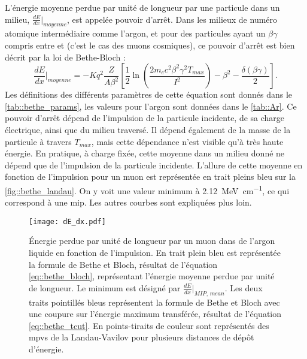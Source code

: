        L'énergie moyenne perdue par unité de longueur par une particule dans un milieu, $\frac{dE}{dx}\rvert_{moyenne}$, est appelée pouvoir d'arrêt. Dans les milieux de numéro atomique intermédiaire comme l'argon, et pour des particules ayant un $\beta\gamma$ compris entre  et  (c'est le cas des muons cosmiques), ce pouvoir d'arrêt est bien décrit par la loi de Bethe-Bloch\cite{pdg2018} :
        \begin{equation}\label{eq::bethe_bloch}
          \frac{dE}{dx}\biggr\rvert_{moyenne} = -Kq^2 \frac{Z}{A\beta^2}\left[\frac{1}{2}\ln\left(\frac{2m_ec^2\beta^2\gamma^2T_{max}}{I^2}\right)-\beta^2-\frac{\delta(\beta\gamma)}{2} \right].
        \end{equation}
        Les définitions des différents paramètres de cette équation sont donnés dans le \autoref{tab::bethe_params}, les valeurs pour l'argon sont données dans le \autoref{tab::Ar}. Ce pouvoir d'arrêt dépend de l'impulsion de la particule incidente, de sa charge électrique, ainsi que du milieu traversé. Il dépend également de la masse de la particule à travers $T_{max}$, mais cette dépendance n'est visible qu'à très haute énergie\cite{pdg2018}. En pratique, à charge fixée, cette moyenne dans un milieu donné ne dépend que de l'impulsion de la particule incidente. L'allure de cette moyenne en fonction de l'impulsion pour un muon est représentée en trait pleins bleu sur la \autoref{fig::bethe_landau}. On y voit une valeur minimum à \SI{2.12}{\mega\electronvolt\per\centi\meter}, ce qui correspond à une \gls{mip}. Les autres courbes sont expliquées plus loin.

        \begin{figure}[htbp]
          \centering
          \texttt{[image: dE\_dx.pdf]}
          \caption[Énergie perdue par unité de longueur d'une MIP en fonction de l'impulsion]{\label{fig::bethe_landau}Énergie perdue par unité de longueur par un muon dans de l'argon liquide en fonction de l'impulsion. En trait plein bleu est représentée la formule de Bethe et Bloch, résultat de l'équation \eqref{eq::bethe_bloch}, représentant l'énergie moyenne perdue par unité de longueur. Le minimum est désigné par $\frac{dE}{dx}\rvert_{MIP,\,mean}$. Les deux traits pointillés bleus représentent la formule de Bethe et Bloch avec une coupure sur l'énergie maximum transférée, résultat de l'équation \eqref{eq::bethe_tcut}. En points-tiraits de couleur sont représentés des \glspl{mpv} de la Landau-Vavilov pour plusieurs distances de dépôt d'énergie.}
        \end{figure}

